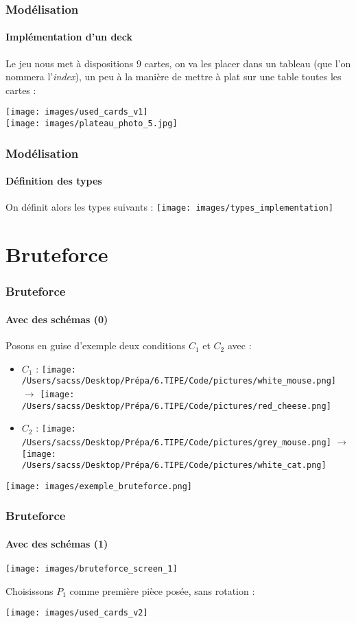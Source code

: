 \documentclass{beamer}
\begin{document}
\begin{frame}
	\frametitle{Modélisation}
	\framesubtitle{Implémentation d'un deck}
	
	Le jeu nous met à dispositions $9$ cartes, on va les placer dans un tableau (que l'on nommera l'\textit{index}), un peu à la manière de mettre à plat sur une table toutes les cartes : 
	\vspace*{\fill}
	\begin{center}
		\vspace*{\fill}
		\texttt{[image: images/used\_cards\_v1]} \vspace*{\fill} \\
		\texttt{[image: images/plateau\_photo\_5.jpg]}
	\end{center}
	\vspace*{\fill}
	
	
\end{frame}

\begin{frame}
	\frametitle{Modélisation}
	\framesubtitle{Définition des types}
	\small On définit alors les types suivants : 
	\texttt{[image: images/types\_implementation]}


	\end{frame}
	
	
\section{Bruteforce}
\begin{frame}
	\frametitle{Bruteforce}
	\framesubtitle{Avec des schémas (0)}
	Posons en guise d'exemple deux conditions $C_1$ et $C_2$ avec : 
	\begin{itemize}
		\item $C_1$ : \texttt{[image: /Users/sacss/Desktop/Prépa/6.TIPE/Code/pictures/white\_mouse.png]} $\rightarrow$ \texttt{[image: /Users/sacss/Desktop/Prépa/6.TIPE/Code/pictures/red\_cheese.png]}
		\item $C_2$ : \texttt{[image: /Users/sacss/Desktop/Prépa/6.TIPE/Code/pictures/grey\_mouse.png]} $\rightarrow$ \texttt{[image: /Users/sacss/Desktop/Prépa/6.TIPE/Code/pictures/white\_cat.png]}
	\end{itemize}
	\begin{center}
		\texttt{[image: images/exemple\_bruteforce.png]}
	\end{center}
\end{frame}

\begin{frame}
	\frametitle{Bruteforce}
	\framesubtitle{Avec des schémas (1)}
	\begin{center}
		\texttt{[image: images/bruteforce\_screen\_1]}
	\end{center}
	\footnotesize
	Choisissons $P_1$ comme première pièce posée, sans rotation : 
	
	\begin{center}
		\texttt{[image: images/used\_cards\_v2]}
	\end{center}
	
\end{frame}
\end{document}
